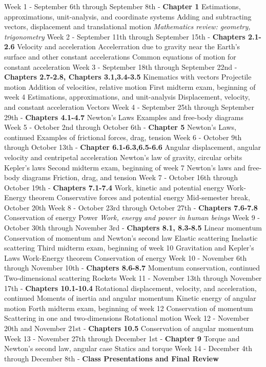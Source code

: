 \documentclass[10pt]{article}
\begin{document}
\begin{outline}[enumerate]
\1 Week 1 - September 6th through September 8th - \textbf{Chapter 1}
\2 Estimations, approximations, unit-analysis, and coordinate systems
\2 Adding and subtracting vectors, displacement and translational motion
\2 \textit{Mathematics review: geometry, trigonometry}
\1 Week 2 - September 11th through September 15th - \textbf{Chapters 2.1-2.6}
\2 Velocity and acceleration
\2 Accelerration due to gravity near the Earth's surface and other constant accelerations
\2 Common equations of motion for constant acceleration
\1 Week 3 - September 18th through September 22nd - \textbf{Chapters 2.7-2.8, Chapters 3.1,3.4-3.5}
\2 Kinematics with vectors
\2 Projectile motion
\2 Addition of velocities, relative motion
\1 First midterm exam, beginning of week 4
\2 Estimations, approximations, and unit-analysis
\2 Displacement, velocity, and constant acceleration
\2 Vectors
\1 Week 4 - September 25th through September 29th - \textbf{Chapters 4.1-4.7}
\2 Newton's Laws
\2 Examples and free-body diagrams
\1 Week 5 - October 2nd through October 6th - \textbf{Chapter 5}
\2 Newton's Laws, continued
\2 Examples of frictional forces, drag, tension
\1 Week 6 - October 9th through October 13th - \textbf{Chapter 6.1-6.3,6.5-6.6}
\2 Angular displacement, angular velocity and centripetal acceleration
\2 Newton's law of gravity, circular orbits
\2 Kepler's laws
\1 Second midterm exam, beginning of week 7
\2 Newton's laws and free-body diagrams
\2 Friction, drag, and tension
\1 Week 7 - October 16th through October 19th - \textbf{Chapters 7.1-7.4}
\2 Work, kinetic and potential energy
\2 Work-Energy theorem
\2 Conservative forces and potential energy
\1 Mid-semester break, October 20th
\1 Week 8 - October 23rd through October 27th - \textbf{Chapters 7.6-7.8}
\2 Conservation of energy
\2 Power
\2 \textit{Work, energy and power in human beings}
\1 Week 9 - October 30th through November 3rd - \textbf{Chapters 8.1, 8.3-8.5}
\2 Linear momentum
\2 Conservation of momentum and Newton's second law
\2 Elastic scattering
\2 Inelastic scattering
\1 Third midterm exam, beginning of week 10
\2 Gravitation and Kepler's Laws
\2 Work-Energy theorem
\2 Conservation of energy
\1 Week 10 - November 6th through November 10th - \textbf{Chapters 8.6-8.7}
\2 Momentum conservation, continued
\2 Two-dimensional scattering
\2 Rockets
\1 Week 11 - November 13th through November 17th - \textbf{Chapters 10.1-10.4}
\2 Rotational displacement, velocity, and acceleration, continued
\2 Moments of inertia and angular momentum
\2 Kinetic energy of angular motion
\1 Forth midterm exam, beginning of week 12
\2 Conservation of momentum
\2 Scattering in one and two-dimensions
\2 Rotational motion
\1 Week 12 - November 20th and November 21st - \textbf{Chapters 10.5}
\2 Conservation of angular momentum
\1 Week 13 - November 27th through December 1st  - \textbf{Chapter 9}
\2 Torque and Newton's second law, angular case
\2 Statics and torque
\1 Week 14 - December 4th through December 8th - \textbf{Class Presentations and Final Review}
\end{outline}
\end{document}
